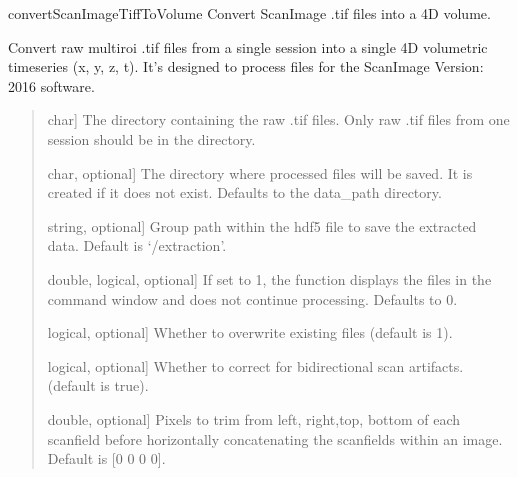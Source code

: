 \documentclass[letterpaper,10pt,english]{sphinxmanual}
\begin{document}

\begin{fulllineitems}
\label{\detokenize{api/core:convertScanImageTiffToVolume}}
\pysigstartsignatures
{}
\pysigstopsignatures
\sphinxAtStartPar
convertScanImageTiffToVolume Convert ScanImage .tif files into a 4D volume.

\sphinxAtStartPar
Convert raw  multi\sphinxhyphen{}roi .tif files from a single session
into a single 4D volumetric time\sphinxhyphen{}series (x, y, z, t). It’s designed to process files for the
ScanImage Version: 2016 software.
\begin{quote}\begin{description}
\begin{description}
\sphinxlineitem{\sphinxstylestrong{data\_path}}{[}char{]}
\sphinxAtStartPar
The directory containing the raw .tif files. Only raw .tif files from one
session should be in the directory.

\sphinxlineitem{\sphinxstylestrong{save\_path}}{[}char, optional{]}
\sphinxAtStartPar
The directory where processed files will be saved. It is created if it does
not exist. Defaults to the data\_path directory.

\sphinxlineitem{\sphinxstylestrong{group\_path}}{[}string, optional{]}
\sphinxAtStartPar
Group path within the hdf5 file to save the extracted data. Default is
‘/extraction’.

\sphinxlineitem{\sphinxstylestrong{debug\_flag}}{[}double, logical, optional{]}
\sphinxAtStartPar
If set to 1, the function displays the files in the command window and does
not continue processing. Defaults to 0.

\sphinxlineitem{\sphinxstylestrong{overwrite}}{[}logical, optional{]}
\sphinxAtStartPar
Whether to overwrite existing files (default is 1).

\sphinxlineitem{\sphinxstylestrong{fix\_scan\_phase}}{[}logical, optional{]}
\sphinxAtStartPar
Whether to correct for bi\sphinxhyphen{}directional scan artifacts. (default is true).

\sphinxlineitem{\sphinxstylestrong{trim\_pixels}}{[}double, optional{]}
\sphinxAtStartPar
Pixels to trim from left, right,top, bottom of each scanfield before
horizontally concatenating the scanfields within an image. Default is
{[}0 0 0 0{]}.


\end{description}
\end{description}
\end{quote}
\end{fulllineitems}
\end{document}
